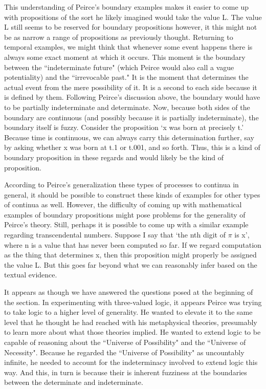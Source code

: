\documentclass[12pt]{article}
\begin{document}
This understanding of Peirce's boundary examples makes it easier to come up with propositions of the sort he likely imagined would take the value L. The value L still seems to be reserved for boundary propositions however, it this might not be as narrow a range of propositions as previously thought. Returning to temporal examples, we might think that whenever some event happens there is always some exact moment at which it occurs. This moment is the boundary between the ``indeterminate future" (which Peirce would also call a vague potentiality) and the ``irrevocable past." It is the moment that determines the actual event from the mere possibility of it. It is a second to each side because it is defined by them. Following Peirce's discussion above, the boundary would have to be partially indeterminate and determinate. Now, because both sides of the boundary are continuous (and possibly because it is partially indeterminate), the boundary itself is fuzzy. Consider the proposition `x was born at precisely t.' Because time is continuous, we can always carry this determination further, say by asking whether x was born at t.1 or t.001, and so forth. Thus, this is a kind of boundary proposition in these regards and would likely be the kind of proposition. 

According to Peirce's generalization these types of processes to continua in general, it should be possible to construct these kinds of examples for other types of continua as well. However, the difficulty of coming up with mathematical examples of boundary propositions might pose problems for the generality of Peirce's theory. Still, perhaps it is possible to come up with a similar example regarding transcendental numbers. Suppose I say that `the nth digit of $\pi$ is x', where n is a value that has never been computed so far. If we regard computation as the thing that determines x, then this proposition might properly be assigned the value L. But this goes far beyond what we can reasonably infer based on the textual evidence.

It appears as though we have answered the questions posed at the beginning of the section. In experimenting with three-valued logic, it appears Peirce was trying to take logic to a higher level of generality. He wanted to elevate it to the same level that he thought he had reached with his metaphysical theories, presumably to learn more about what those theories implied. He wanted to extend logic to be capable of reasoning about the ``Universe of Possibility" and the ``Universe of Necessity". Because he regarded the ``Universe of Possibility" as uncountably infinite, he needed to account for the indeterminacy involved to extend logic this way. And this, in turn is because their is inherent fuzziness at the boundaries between the determinate and indeterminate.
\end{document}
